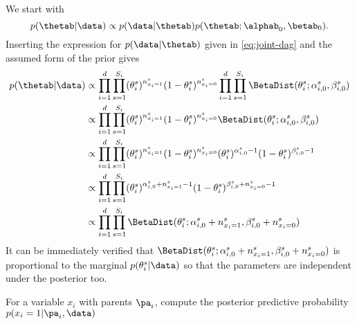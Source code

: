 \begin{exenumerate}
  \begin{solution}
    We start with
    \begin{equation}
      p(\thetab | \data) \propto p(\data | \thetab) p(\thetab; \alphab_0, \betab_0).
    \end{equation}
    Inserting the expression for $p(\data | \thetab)$ given in \eqref{eq:joint-dag} and the assumed form of the prior gives
    \begin{align}
      p(\thetab | \data) &\propto  \prod_{i=1}^d \prod_{s=1}^{S_i}  (\theta_i^s)^{n_{x_i=1}^s} (1-\theta_i^s)^{n_{x_i=0}^s} \prod_{i=1}^d \prod_{s=1}^{S_i} \BetaDist(\theta_i^s; \alpha_{i,0}^s, \beta_{i,0}^s)\\
      & \propto \prod_{i=1}^d \prod_{s=1}^{S_i}   (\theta_i^s)^{n_{x_i=1}^s} (1-\theta_i^s)^{n_{x_i=0}^s}  \BetaDist(\theta_i^s; \alpha_{i,0}^s, \beta_{i,0}^s)\\
      & \propto \prod_{i=1}^d \prod_{s=1}^{S_i}   (\theta_i^s)^{n_{x_i=1}^s} (1-\theta_i^s)^{n_{x_i=0}^s} (\theta_i^s)^{\alpha_{i,0}^s-1} (1-\theta_i^s)^{\beta_{i,0}^s-1}\\
      & \propto \prod_{i=1}^d \prod_{s=1}^{S_i}   (\theta_i^s)^{\alpha_{i,0}^s+n_{x_i=1}^s-1} (1-\theta_i^s)^{\beta_{i,0}^s+n_{x_i=0}^s-1}\\
      & \propto \prod_{i=1}^d \prod_{s=1}^{S_i} \BetaDist(\theta_i^s; \alpha_{i,0}^s+n_{x_i=1}^s, \beta_{i,0}^s+n_{x_i=0}^s)
    \end{align}
    It can be immediately verified that $\BetaDist(\theta_i^s; \alpha_{i,0}^s+n_{x_i=1}^s, \beta_{i,0}^s+n_{x_i=0}^s)$ is proportional to the marginal $p(\theta_i^s | \data)$ so that the parameters are independent under the posterior too.
  \end{solution}

\item \label{q:dgm-posterior-predictive} For a variable $x_i$ with parents $\pa_i$, compute the posterior predictive probability $p(x_i=1|\pa_i, \data)$


\end{exenumerate}
